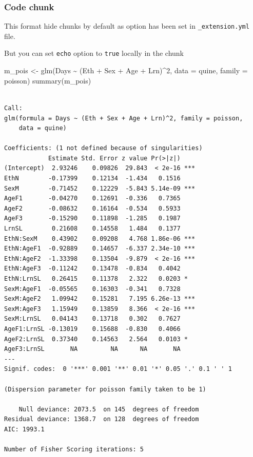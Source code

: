 \documentclass[fleqn,10pt]{wlscirep}
\newenvironment{Shaded}{\begin{snugshade}}{\end{snugshade}}
\newcommand{\AttributeTok}[1]{\textcolor[rgb]{0.40,0.45,0.13}{#1}}
\newcommand{\DecValTok}[1]{\textcolor[rgb]{0.68,0.00,0.00}{#1}}
\newcommand{\FunctionTok}[1]{\textcolor[rgb]{0.28,0.35,0.67}{#1}}
\newcommand{\NormalTok}[1]{\textcolor[rgb]{0.00,0.23,0.31}{#1}}
\newcommand{\OtherTok}[1]{\textcolor[rgb]{0.00,0.23,0.31}{#1}}
\newcommand{\SpecialCharTok}[1]{\textcolor[rgb]{0.37,0.37,0.37}{#1}}
\begin{document}
\hypertarget{sec-chunks}{%
\subsubsection{Code chunk}\label{sec-chunks}}

This format hide chunks by default as option has been set in
\texttt{\_extension.yml} file.

But you can set \texttt{echo} option to \texttt{true} locally in the
chunk

\begin{Shaded}
\begin{Highlighting}[]
\NormalTok{m\_pois }\OtherTok{\textless{}{-}} \FunctionTok{glm}\NormalTok{(Days }\SpecialCharTok{\textasciitilde{}}\NormalTok{ (Eth }\SpecialCharTok{+}\NormalTok{ Sex }\SpecialCharTok{+}\NormalTok{ Age }\SpecialCharTok{+}\NormalTok{ Lrn)}\SpecialCharTok{\^{}}\DecValTok{2}\NormalTok{, }\AttributeTok{data =}\NormalTok{ quine, }\AttributeTok{family =}\NormalTok{ poisson)}
\FunctionTok{summary}\NormalTok{(m\_pois)}
\end{Highlighting}
\end{Shaded}

\begin{verbatim}

Call:
glm(formula = Days ~ (Eth + Sex + Age + Lrn)^2, family = poisson, 
    data = quine)

Coefficients: (1 not defined because of singularities)
            Estimate Std. Error z value Pr(>|z|)    
(Intercept)  2.93246    0.09826  29.843  < 2e-16 ***
EthN        -0.17399    0.12134  -1.434   0.1516    
SexM        -0.71452    0.12229  -5.843 5.14e-09 ***
AgeF1       -0.04270    0.12691  -0.336   0.7365    
AgeF2       -0.08632    0.16164  -0.534   0.5933    
AgeF3       -0.15290    0.11898  -1.285   0.1987    
LrnSL        0.21608    0.14558   1.484   0.1377    
EthN:SexM    0.43902    0.09208   4.768 1.86e-06 ***
EthN:AgeF1  -0.92889    0.14657  -6.337 2.34e-10 ***
EthN:AgeF2  -1.33398    0.13504  -9.879  < 2e-16 ***
EthN:AgeF3  -0.11242    0.13478  -0.834   0.4042    
EthN:LrnSL   0.26415    0.11378   2.322   0.0203 *  
SexM:AgeF1  -0.05565    0.16303  -0.341   0.7328    
SexM:AgeF2   1.09942    0.15281   7.195 6.26e-13 ***
SexM:AgeF3   1.15949    0.13859   8.366  < 2e-16 ***
SexM:LrnSL   0.04143    0.13718   0.302   0.7627    
AgeF1:LrnSL -0.13019    0.15688  -0.830   0.4066    
AgeF2:LrnSL  0.37340    0.14563   2.564   0.0103 *  
AgeF3:LrnSL       NA         NA      NA       NA    
---
Signif. codes:  0 '***' 0.001 '**' 0.01 '*' 0.05 '.' 0.1 ' ' 1

(Dispersion parameter for poisson family taken to be 1)

    Null deviance: 2073.5  on 145  degrees of freedom
Residual deviance: 1368.7  on 128  degrees of freedom
AIC: 1993.1

Number of Fisher Scoring iterations: 5
\end{verbatim}
\end{document}
